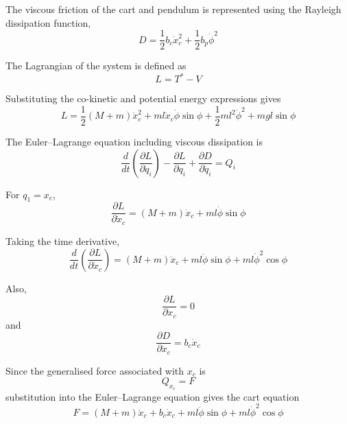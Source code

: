\documentclass[11pt,a4paper]{article}
\begin{document}
The viscous friction of the cart and pendulum is represented using the Rayleigh
dissipation function,
\begin{equation*}
	D = \frac{1}{2} b_{c} \dot{x}_{c}^{2} + \frac{1}{2} b_{p} \dot{\phi}^{2}
\end{equation*}

The Lagrangian of the system is defined as
\begin{equation*}
	L = T^{*} - V
\end{equation*}

Substituting the co-kinetic and potential energy expressions gives
\begin{equation*}
	L = \frac{1}{2} \left( M + m \right) \dot{x}_{c}^{2}
	+ m l \dot{x}_{c} \dot{\phi} \sin\phi
	+ \frac{1}{2} m l^{2} \dot{\phi}^{2}
	+ m g l \sin\phi
\end{equation*}

The Euler--Lagrange equation including viscous dissipation is
\begin{equation*}
	\frac{d}{dt} \left( \frac{\partial L}{\partial \dot{q}_{i}} \right)
	- \frac{\partial L}{\partial q_{i}}
	+ \frac{\partial D}{\partial \dot{q}_{i}} = Q_{i}
\end{equation*}

For $q_{1} = x_{c}$,
\begin{equation*}
	\frac{\partial L}{\partial \dot{x}_{c}}
	= \left( M + m \right) \dot{x}_{c} + m l \dot{\phi} \sin\phi
\end{equation*}

Taking the time derivative,
\begin{equation*}
	\frac{d}{dt} \left( \frac{\partial L}{\partial \dot{x}_{c}} \right)
	= \left( M + m \right) \ddot{x}_{c}
	+ m l \ddot{\phi} \sin\phi
	+ m l \dot{\phi}^{2} \cos\phi
\end{equation*}

Also,
\begin{equation*}
	\frac{\partial L}{\partial x_{c}} = 0
\end{equation*}
and
\begin{equation*}
	\frac{\partial D}{\partial \dot{x}_{c}} = b_{c} \dot{x}_{c}
\end{equation*}

Since the generalised force associated with $x_{c}$ is
\begin{equation*}
	Q_{x_{c}} = F
\end{equation*}
substitution into the Euler--Lagrange equation gives the cart equation
\begin{equation*}
	\boxed{\;
		F = \left( M + m \right) \ddot{x}_{c}
		+ b_{c} \dot{x}_{c}
		+ m l \ddot{\phi} \sin\phi
		+ m l \dot{\phi}^{2} \cos\phi
		\;} \tag{1a}
\end{equation*}
\end{document}
